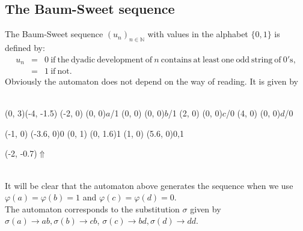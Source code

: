 \documentclass{article}
\begin{document}
\subsection{The Baum-Sweet sequence}
The Baum-Sweet sequence $(u_n)_{n \in \mathbb{N}}$ with values in the alphabet
$\{0, 1\}$ is defined by:\\
\vbox{\begin{eqnarray*}
u_n &=& 0 \mathrm{\ if\ the\ dyadic\ development\ of\ } n
          \mathrm{\ contains\ at\ least\ one\ odd\ string\ of\ 0's},\\
    &=& 1 \mathrm{\ if\ not.}
\end{eqnarray*}}
Obviously the automaton does not depend on the way of reading. It is given by\\
\\
\begin{graph}(0, 3)(-4, -1.5)
  (-2, 0) (0, 0){$a$/1}
  (0, 0)  (0, 0){$b$/1}
  (2, 0)  (0, 0){$c$/0}
  (4, 0)  (0, 0){$d$/0}

  (-1, 0) \freetext(-3.6, 0){0}
   
   
  (0, 1) \freetext(0, 1.6){1}
   
   
  (1, 0) \freetext(5.6, 0){0,1}

  \freetext(-2, -0.7){$\Uparrow$}
\end{graph}\\
It will be clear that the automaton above generates the sequence when we use
$\varphi(a) = \varphi(b) = 1$ and $\varphi(c) = \varphi(d) = 0$.\\
The automaton corresponds to the substitution $\sigma$ given by
$\sigma(a) \to ab, \sigma(b) \to cb$,
$\sigma(c) \to bd, \sigma(d) \to dd$.
\end{document}
